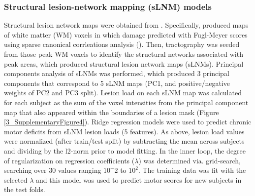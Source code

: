 \documentclass[phd,tocprelim]{cornell}
\begin{document}
\subsubsection{Structural lesion-network mapping (sLNM) models}
Structural lesion network maps were obtained from \cite{Bowren2022-rs}. Specifically, \cite{Bowren2022-rs} produced maps of white matter (WM) voxels in which damage predicted with Fugl-Meyer scores using sparse canonical corrleations analysis (\cite{Pustina2018-xv}). Then, tractography was seeded from those peak WM voxels to identify the structural networks associated with peak areas, which produced structural lesion network maps (sLNMs). Principal components analysis of sLNMs was performed, which produced 3 principal components that correspond to 5 sLNM maps (PC1, and positive/negative weights of PC2 and PC3 split). Lesion load on each sLNM map was calculated for each subject as the sum of the voxel intensities from the principal component map that also appeared within the boundaries of a lesion mask (Figure \ref{3_SupplementaryFigure4}). Ridge regression models were used to predict chronic motor deficits from sLNM lesion loads (5 features). As above, lesion load values were normalized (after train/test split) by subtracting the mean across subjects and dividing by the l2-norm prior to model fitting. In the inner loop, the degree of regularization on regression coefficients ($\lambda$) was determined via. grid-search, searching over 30 values ranging $10^-2$ to $10^2$. The training data was fit with the selected $\lambda$ and this model was used to predict motor scores for new subjects in the test folds. 
\end{document}
